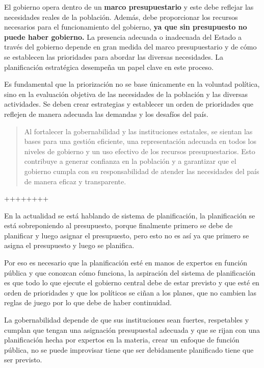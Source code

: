 \documentclass[
  a4paper,
]{article}
\begin{document}
El gobierno opera dentro de un \textbf{marco presupuestario} y este debe
reflejar las necesidades reales de la población. Además, debe
proporcionar los recursos necesarios para el funcionamiento del
gobierno, \textbf{ya que sin presupuesto no puede haber gobierno.} La
presencia adecuada o inadecuada del Estado a través del gobierno depende
en gran medida del marco presupuestario y de cómo se establecen las
prioridades para abordar las diversas necesidades. La planificación
estratégica desempeña un papel clave en este proceso.

Es fundamental que la priorización no se base únicamente en la voluntad
política, sino en la evaluación objetiva de las necesidades de la
población y las diversas actividades. Se deben crear estrategias y
establecer un orden de prioridades que reflejen de manera adecuada las
demandas y los desafíos del país.

\begin{quote}
Al fortalecer la gobernabilidad y las instituciones estatales, se
sientan las bases para una gestión eficiente, una representación
adecuada en todos los niveles de gobierno y un uso efectivo de los
recursos presupuestarios. Esto contribuye a generar confianza en la
población y a garantizar que el gobierno cumpla con su responsabilidad
de atender las necesidades del país de manera eficaz y transparente.
\end{quote}

++++++++

En la actualidad se está hablando de sistema de planificación, la
planificación se está sobreponiendo al presupuesto, porque finalmente
primero se debe de planificar y luego asignar el presupuesto, pero esto
no es así ya que primero se asigna el presupuesto y luego se planifica.

Por eso es necesario que la planificación esté en manos de expertos en
función pública y que conozcan cómo funciona, la aspiración del sistema
de planificación es que todo lo que ejecute el gobierno central debe de
estar previsto y que esté en orden de prioridades y que los políticos se
ciñan a los planes, que no cambien las reglas de juego por lo que debe
de haber continuidad.

La gobernabilidad depende de que sus instituciones sean fuertes,
respetables y cumplan que tengan una asignación presupuestal adecuada y
que se rijan con una planificación hecha por expertos en la materia,
crear un enfoque de función pública, no se puede improvisar tiene que
ser debidamente planificado tiene que ser previsto.
\end{document}

